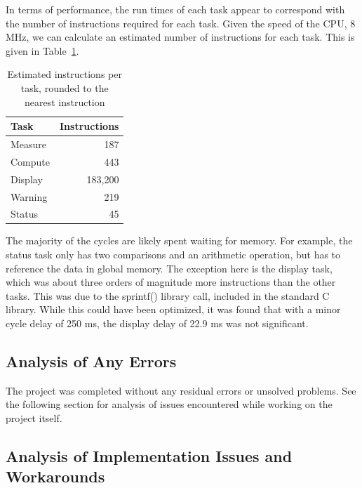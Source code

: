 \documentclass[12pt]{article} %
\begin{document}
In terms of performance, the run times of each task appear to correspond with
the number of instructions required for each task.  Given the speed of the CPU,
8 MHz, we can calculate an estimated number of instructions for each task.
This is given in Table~\ref{tab:instr}.
\begin{table}[h]
	\centering
	\begin{tabular}{|l|r|} 
		\hline
		Task & Instructions \\ \hline
		Measure & 187 \\ \hline
		Compute & 443 \\ \hline
		Display & 183,200 \\ \hline
		Warning & 219	\\ \hline
		Status & 45	\\ \hline
	\end{tabular}
	\caption{Estimated instructions per task, rounded to the nearest instruction}
  \label{tab:instr}
\end{table}
The majority of the cycles are likely spent waiting for memory.  For example,
the status task only has two comparisons and an arithmetic operation, but has
to reference the data in global memory.  The exception here is the display
task, which was about three orders of magnitude more instructions than the
other tasks.  This was due to the sprintf() library call, included in the
standard C library.  While this could have been optimized, it was found that
with a minor cycle delay of 250 ms, the display delay of 22.9 ms was not
significant.


\subsection{Analysis of Any Errors}
The project was completed without any residual errors or unsolved problems. See the following section for analysis of issues encountered while working on the project itself.

\subsection{Analysis of Implementation Issues and Workarounds}


\end{document}
